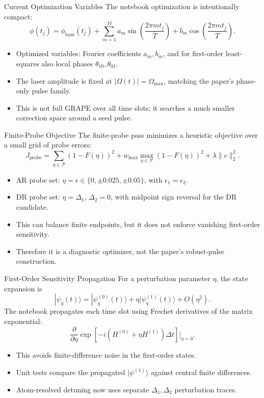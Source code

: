 \documentclass[aspectratio=169]{beamer}
\begin{document}
\begin{frame}{Current Optimization Variables}
  The notebook optimization is intentionally compact:
  \[
    \phi(t_j)=\phi_{\mathrm{base}}(t_j)+
      \sum_{m=1}^{M}
      a_m\sin\left(\frac{2\pi m t_j}{T}\right)
      +b_m\cos\left(\frac{2\pi m t_j}{T}\right).
  \]
  \begin{itemize}
    \item Optimized variables: Fourier coefficients \(a_m,b_m\), and for first-order least-squares also local phases \(\theta_{10},\theta_{01}\).
    \item The laser amplitude is fixed at \(|\Omega(t)|=\Omega_{\max}\), matching the paper's phase-only pulse family.
    \item This is not full GRAPE over all time slots; it searches a much smaller correction space around a seed pulse.
  \end{itemize}
\end{frame}

\begin{frame}{Finite-Probe Objective}
  The finite-probe pass minimizes a heuristic objective over a small grid of probe errors:
  \[
    J_{\mathrm{probe}}
      =
      \sum_{\eta\in\mathcal{P}}\left(1-F(\eta)\right)^2
      +w_{\max}\max_{\eta\in\mathcal{P}}\left(1-F(\eta)\right)^2
      +\lambda\|c\|_2^2 .
  \]
  \begin{itemize}
    \item AR probe set: \(\eta=\epsilon\in\{0,\pm0.025,\pm0.05\}\), with \(\epsilon_1=\epsilon_2\).
    \item DR probe set: \(\eta=\Delta_1\), \(\Delta_2=0\), with midpoint sign reversal for the DR candidate.
    \item This can balance finite endpoints, but it does not enforce vanishing first-order sensitivity.
    \item Therefore it is a diagnostic optimizer, not the paper's robust-pulse construction.
  \end{itemize}
\end{frame}

\begin{frame}{First-Order Sensitivity Propagation}
  For a perturbation parameter \(\eta\), the state expansion is
  \[
    |\psi_q(t)\rangle =
      |\psi_q^{(0)}(t)\rangle
      +\eta|\psi_q^{(1)}(t)\rangle
      +O(\eta^2).
  \]
  The notebook propagates each time slot using Frechet derivatives of the matrix exponential:
  \[
    \frac{\partial}{\partial\eta}
    \exp[-i(H^{(0)}+\eta H^{(1)})\Delta t]\bigg|_{\eta=0}.
  \]
  \begin{itemize}
    \item This avoids finite-difference noise in the first-order states.
    \item Unit tests compare the propagated \(|\psi^{(1)}\rangle\) against central finite differences.
    \item Atom-resolved detuning now uses separate \(\Delta_1,\Delta_2\) perturbation traces.
  \end{itemize}
\end{frame}
\end{document}
